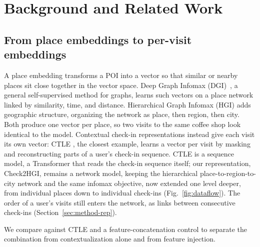 \section{Background and Related Work}
\label{sec:related}

\subsection{From place embeddings to per-visit embeddings}
\label{sec:related-embeddings}
A place embedding transforms a POI into a vector so that similar or nearby
places sit close together in the vector space.
Deep Graph Infomax (DGI)~\cite{velickovic2019dgi}, a general self-supervised
method for graphs, learns such vectors on a place network linked by
similarity, time, and distance.
Hierarchical Graph Infomax (HGI) \cite{huang2023hgi} adds geographic structure,
organizing the network as place, then region, then city. Both produce one vector per place, so two visits to the same coffee shop look
identical to the model.
Contextual check-in representations instead give each visit its own vector: CTLE
\cite{lin2021ctle}, the closest example, learns a vector per visit by masking and
reconstructing parts of a user's check-in sequence. CTLE is a sequence model, a Transformer that reads the
check-in sequence itself; our representation, Check2HGI, remains a network model, keeping the
hierarchical place-to-region-to-city network and the same infomax objective,
now extended one level deeper, from individual places down to individual
check-ins (Fig.~\ref{fig:dataflow}). The order of a user's visits still enters
the network, as links between consecutive check-ins
(Section~\ref{sec:method-rep}).

We compare against CTLE and a feature-concatenation control to separate the
combination from contextualization alone and from feature injection.

